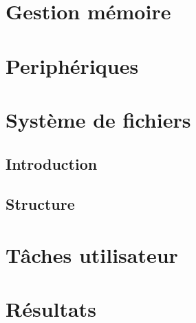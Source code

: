\documentclass[a4paper, 12pt]{article}
\begin{document}
\newpage

\section{Gestion mémoire}


\newpage

\section{Periphériques}


\newpage

\section{Système de fichiers}
\subsection{Introduction}


\subsection{Structure}

\newpage

\section{Tâches utilisateur}

\newpage

\section{Résultats}
\end{document}
